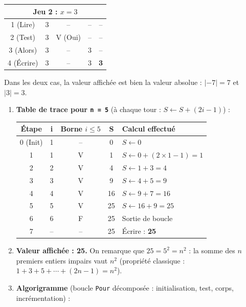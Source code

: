 \documentclass[11pt]{article}
\begin{document}
\begin{corrige}
\begin{enumerate}
\begin{center}
\begin{tabular}{|c|c|c|c|c|}
\hline
\multicolumn{5}{|c|}{\cellcolor{popcream} Jeu 2 : $x = 3$} \\
\hline
1 (Lire) & $3$ & -- & -- & -- \\
2 (Test) & $3$ & V (Oui) & -- & -- \\
3 (Alors) & $3$ & -- & $3$ & -- \\
4 (Écrire) & $3$ & -- & $3$ & \textbf{3} \\
\hline
\end{tabular}
\end{center}
Dans les deux cas, la valeur affichée est bien la valeur absolue : $|-7| = 7$ et $|3| = 3$.
\end{enumerate}
\end{corrige}

\begin{corrige}
\begin{enumerate}
\item \textbf{Table de trace pour \texttt{n = 5}} (à chaque tour : $S \leftarrow S + (2i-1)$) :
\begin{center}
\begin{tabularx}{\linewidth}{|c|c|c|c|X|}
\hline
\rowcolor{popblueL} \textbf{Étape} & \textbf{i} & \textbf{Borne $i \leq 5$} & \textbf{S} & \textbf{Calcul effectué} \\
\hline
0 (Init) & 1 & -- & 0 & $S \leftarrow 0$ \\
\hline
1 & 1 & V & 1 & $S \leftarrow 0 + (2\times1-1) = 1$ \\
2 & 2 & V & 4 & $S \leftarrow 1 + 3 = 4$ \\
3 & 3 & V & 9 & $S \leftarrow 4 + 5 = 9$ \\
4 & 4 & V & 16 & $S \leftarrow 9 + 7 = 16$ \\
5 & 5 & V & 25 & $S \leftarrow 16 + 9 = 25$ \\
6 & 6 & F & 25 & Sortie de boucle \\
\hline
7 & -- & -- & 25 & Écrire : \textbf{25} \\
\hline
\end{tabularx}
\end{center}
\item \textbf{Valeur affichée : 25.} On remarque que $25 = 5^2 = n^2$ : la somme des $n$ premiers entiers impairs vaut $n^2$ (propriété classique : $1+3+5+\cdots+(2n-1) = n^2$).
\item \textbf{Algorigramme} (boucle \texttt{Pour} décomposée : initialisation, test, corps, incrémentation) :
\begin{popfigure}

\end{popfigure}
\end{enumerate}
\end{corrige}
\end{document}
